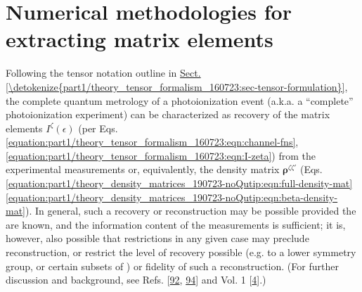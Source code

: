\documentclass[letterpaper,table,10pt,english]{jupyterBook}
\begin{document}
\chapter{Numerical methodologies for extracting matrix elements}
\label{\detokenize{part1/numerics_070723:numerical-methodologies-for-extracting-matrix-elements}}\label{\detokenize{part1/numerics_070723:chpt-numerical-details}}\label{\detokenize{part1/numerics_070723::doc}}
\sphinxAtStartPar
Following the tensor notation outline in \hyperref[\detokenize{part1/theory_tensor_formalism_160723:sec-tensor-formulation}]{Sect.\@ \ref{\detokenize{part1/theory_tensor_formalism_160723:sec-tensor-formulation}}}, the complete quantum metrology of a photoionization event (a.k.a. a “complete” photoionization experiment) can be characterized as recovery of the matrix elements \(I^{\zeta}(\epsilon)\) (per Eqs. \eqref{equation:part1/theory_tensor_formalism_160723:eqn:channel-fns}, \eqref{equation:part1/theory_tensor_formalism_160723:eqn:I-zeta}) from the experimental measurements or, equivalently, the density matrix \(\mathbf{\rho}^{\zeta\zeta'}\) (Eqs. \eqref{equation:part1/theory_density_matrices_190723-noQutip:eqn:full-density-mat} \sphinxhyphen{} \eqref{equation:part1/theory_density_matrices_190723-noQutip:eqn:beta-density-mat}). In general, such a recovery or reconstruction may be possible provided the {\hyperref[\detokenize{backmatter/glossary:term-channel-functions}]{}} are known, and the information content of the measurements is sufficient; it is, however, also possible that restrictions in any given case may preclude reconstruction, or restrict the level of recovery possible (e.g. to a lower symmetry group, or certain subsets of {\hyperref[\detokenize{backmatter/glossary:term-radial-matrix-elements}]{}}) or fidelity of such a reconstruction. (For further discussion and background, see Refs. {[}\hyperlink{cite.backmatter/bibliography:id839}{92}, \hyperlink{cite.backmatter/bibliography:id723}{94}{]} and  Vol. 1 {[}\hyperlink{cite.backmatter/bibliography:id675}{4}{]}.)
\end{document}
